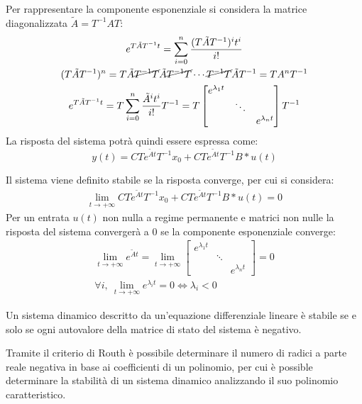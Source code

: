 \documentclass{article}
\numberwithin{equation}{subsection}
\begin{document}
Per rappresentare la componente esponenziale si considera la matrice diagonalizzata $\tilde A=T^{-1}AT$:
\begin{gather}
    \displaystyle e^{T\tilde A T^{-1}t}=\sum_{i=0}^n\frac{(T\tilde AT^{-1})^it^i}{i!}\\
    (T\tilde{A}T^{-1})^n=T\tilde{A}\cancel{T^{-1}T}\tilde{A}\cancel{T^{-1}T}\cdots\cancel{T^{-1}T}\tilde{A}T^{-1}=TA^nT^{-1}\\
    \displaystyle e^{T\tilde A T^{-1}t}=T\sum_{i=0}^n\frac{\tilde A^it^i}{i!}T^{-1}=T 
    \begin{bmatrix}
        e^{\lambda_1t} & & \\
        & \ddots & \\
        & & e^{\lambda_nt}
    \end{bmatrix}T^{-1}
\end{gather}
La risposta del sistema potrà quindi essere espressa come:
\begin{equation}
    y(t)=CTe^{\tilde{A}t}T^{-1}x_0+CTe^{\tilde{A}t}T^{-1}B*u(t)
\end{equation}

Il sistema viene definito stabile se la risposta converge, per cui si considera:
\begin{gather}
    \lim_{t\to+\infty}CTe^{\tilde{A}t}T^{-1}x_0+CTe^{\tilde{A}t}T^{-1}B*u(t)=0
\end{gather}
Per un entrata $u(t)$ non nulla a regime permanente e matrici non nulle la risposta del sistema convergerà a $0$ se la componente esponenziale converge:
\begin{gather}
    \lim_{t\to+\infty}e^{\tilde{A}t}=\lim_{t\to+\infty}\begin{bmatrix}
        e^{\lambda_1t} & & \\
        & \ddots & \\
        & & e^{\lambda_nt}  
    \end{bmatrix}=0\\
    \forall i,\:\lim_{t\to+\infty}e^{\lambda_it}=0\iff \lambda_i<0
\end{gather}

Un sistema dinamico descritto da un'equazione differenziale lineare è stabile se e solo se ogni autovalore della matrice di stato del sistema è negativo. 

Tramite il criterio di Routh è possibile determinare il numero di radici a parte reale negativa in base ai coefficienti di un polinomio, per cui è possible determinare 
la stabilità di un sistema dinamico analizzando il suo polinomio caratteristico. 
\end{document}
